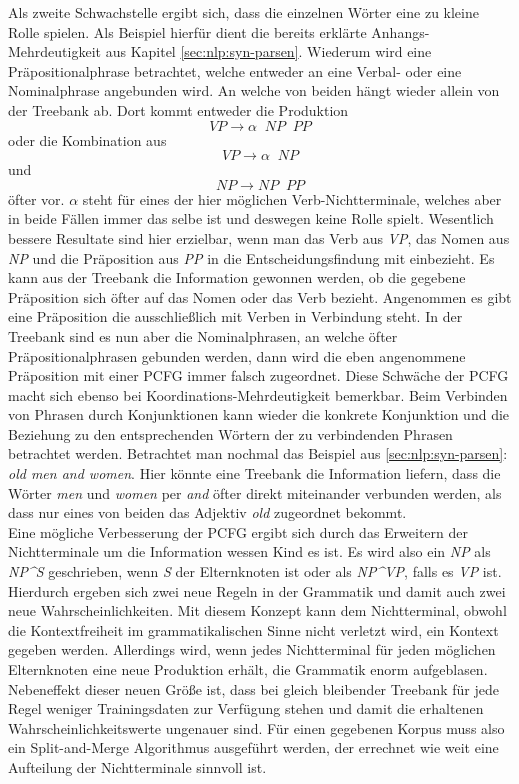 Als zweite Schwachstelle ergibt sich, dass die einzelnen Wörter eine zu kleine Rolle spielen. Als Beispiel hierfür dient die bereits erklärte Anhangs-Mehrdeutigkeit aus Kapitel \ref{sec:nlp:syn-parsen}. Wiederum wird eine Präpositionalphrase betrachtet, welche entweder an eine Verbal- oder eine Nominalphrase angebunden wird. An welche von beiden hängt wieder allein von der Treebank ab. Dort kommt entweder die Produktion \[ VP  \to  \alpha \;\;  NP \;\; PP \] oder die Kombination aus \[ VP  \to  \alpha \;\; NP \] und \[ NP  \to  NP \;\; PP \] öfter vor. \( \alpha \) steht für eines der hier möglichen Verb-Nichtterminale, welches aber in beide Fällen immer das selbe ist und deswegen keine Rolle spielt. Wesentlich bessere Resultate sind hier erzielbar, wenn man das Verb aus \textit{VP}, das Nomen aus \textit{NP} und die Präposition aus \textit{PP} in die Entscheidungsfindung mit einbezieht. Es kann aus der Treebank die Information gewonnen werden, ob die gegebene Präposition sich öfter auf das Nomen oder das Verb bezieht. Angenommen es gibt eine Präposition die ausschließlich mit Verben in Verbindung steht. In der Treebank sind es nun aber die Nominalphrasen, an welche öfter Präpositionalphrasen gebunden werden, dann wird die eben angenommene Präposition mit einer PCFG immer falsch zugeordnet. Diese Schwäche der PCFG macht sich ebenso bei Koordinations-Mehrdeutigkeit bemerkbar. Beim Verbinden von Phrasen durch Konjunktionen kann wieder die konkrete Konjunktion und die Beziehung zu den entsprechenden Wörtern der zu verbindenden Phrasen betrachtet werden. Betrachtet man nochmal das Beispiel aus \ref{sec:nlp:syn-parsen}: \textit{old men and women}. Hier könnte eine Treebank die Information liefern, dass die Wörter \textit{men} und \textit{women} per \textit{and} öfter direkt miteinander verbunden werden, als dass nur eines von beiden das Adjektiv \textit{old} zugeordnet bekommt. \\
Eine mögliche Verbesserung der PCFG ergibt sich durch das Erweitern der Nichtterminale um die Information wessen Kind es ist. Es wird also ein \textit{NP} als \textit{NP\^{}S} geschrieben, wenn \textit{S} der Elternknoten ist oder als \textit{NP\^{}VP}, falls es \textit{VP} ist. Hierdurch ergeben sich zwei neue Regeln in der Grammatik und damit auch zwei neue Wahrscheinlichkeiten. Mit diesem Konzept kann dem Nichtterminal, obwohl die Kontextfreiheit im grammatikalischen Sinne nicht verletzt wird, ein Kontext gegeben werden. Allerdings wird, wenn jedes Nichtterminal für jeden möglichen Elternknoten eine neue Produktion erhält, die Grammatik enorm aufgeblasen. Nebeneffekt dieser neuen Größe ist, dass bei gleich bleibender Treebank für jede Regel weniger Trainingsdaten zur Verfügung stehen und damit die erhaltenen Wahrscheinlichkeitswerte ungenauer sind. Für einen gegebenen Korpus muss also ein Split-and-Merge Algorithmus ausgeführt werden, der errechnet wie weit eine Aufteilung der Nichtterminale sinnvoll ist.  

